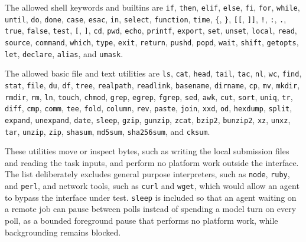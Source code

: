 \documentclass[
english,                 %
bibtex,                  %
]{kththesis}
\numberwithin{listing}{chapter}
\begin{document}
The allowed shell keywords and builtins are \texttt{if}, \texttt{then}, \texttt{elif}, \texttt{else}, \texttt{fi}, \texttt{for}, \texttt{while}, \texttt{until}, \texttt{do}, \texttt{done}, \texttt{case}, \texttt{esac}, \texttt{in}, \texttt{select}, \texttt{function}, \texttt{time}, \texttt{\{}, \texttt{\}}, \texttt{[[}, \texttt{]]}, \texttt{!}, \texttt{:}, \texttt{.}, \texttt{true}, \texttt{false}, \texttt{test}, \texttt{[}, \texttt{]}, \texttt{cd}, \texttt{pwd}, \texttt{echo}, \texttt{printf}, \texttt{export}, \texttt{set}, \texttt{unset}, \texttt{local}, \texttt{read}, \texttt{source}, \texttt{command}, \texttt{which}, \texttt{type}, \texttt{exit}, \texttt{return}, \texttt{pushd}, \texttt{popd}, \texttt{wait}, \texttt{shift}, \texttt{getopts}, \texttt{let}, \texttt{declare}, \texttt{alias}, and \texttt{umask}.

The allowed basic file and text utilities are \texttt{ls}, \texttt{cat}, \texttt{head}, \texttt{tail}, \texttt{tac}, \texttt{nl}, \texttt{wc}, \texttt{find}, \texttt{stat}, \texttt{file}, \texttt{du}, \texttt{df}, \texttt{tree}, \texttt{realpath}, \texttt{readlink}, \texttt{basename}, \texttt{dirname}, \texttt{cp}, \texttt{mv}, \texttt{mkdir}, \texttt{rmdir}, \texttt{rm}, \texttt{ln}, \texttt{touch}, \texttt{chmod}, \texttt{grep}, \texttt{egrep}, \texttt{fgrep}, \texttt{sed}, \texttt{awk}, \texttt{cut}, \texttt{sort}, \texttt{uniq}, \texttt{tr}, \texttt{diff}, \texttt{cmp}, \texttt{comm}, \texttt{tee}, \texttt{fold}, \texttt{column}, \texttt{rev}, \texttt{paste}, \texttt{join}, \texttt{xxd}, \texttt{od}, \texttt{hexdump}, \texttt{split}, \texttt{expand}, \texttt{unexpand}, \texttt{date}, \texttt{sleep}, \texttt{gzip}, \texttt{gunzip}, \texttt{zcat}, \texttt{bzip2}, \texttt{bunzip2}, \texttt{xz}, \texttt{unxz}, \texttt{tar}, \texttt{unzip}, \texttt{zip}, \texttt{shasum}, \texttt{md5sum}, \texttt{sha256sum}, and \texttt{cksum}.

These utilities move or inspect bytes, such as writing the local submission files and reading the task inputs, and perform no platform work outside the interface. The list deliberately excludes general purpose interpreters, such as \texttt{node}, \texttt{ruby}, and \texttt{perl}, and network tools, such as \texttt{curl} and \texttt{wget}, which would allow an agent to bypass the interface under test. \texttt{sleep} is included so that an agent waiting on a remote job can pause between polls instead of spending a model turn on every poll, as a bounded foreground pause that performs no platform work, while backgrounding remains blocked.
\end{document}
